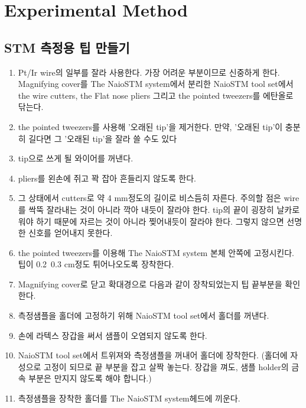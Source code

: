 \documentclass[a4paper, 10pt, nanum]{CSUniSchoolLabReport}
\begin{document}

\section{Experimental Method}

\subsection{STM 측정용 팁 만들기}
	\begin{enumerate}[label=\arabic*.]
		\item Pt/Ir wire의 일부를 잘라 사용한다. 가장 어려운 부분이므로 신중하게 한다.
		Magnifying cover를 The NaioSTM system에서 분리한 NaioSTM tool set에서 the wire cutters, the Flat nose pliers 그리고 the pointed tweezers를 에탄올로 닦는다.		
		\item the pointed tweezers를 사용해 '오래된 tip'을 제거한다. 만약, '오래된 tip'이 충분히 길다면 그 '오래된 tip'을 잘라 쓸 수도 있다
		\item tip으로 쓰게 될 와이어를 꺼낸다.
		\item pliers를 왼손에 쥐고 꽉 잡아 흔들리지 않도록 한다.
		\item 그 상태에서 cutters로 약 4 mm정도의 길이로 비스듬히 자른다. 주의할 점은 wire를 싹뚝 잘라내는 것이 아니라 깍아 내듯이 잘라야 한다. tip의 끝이 굉장히 날카로워야 하기 때문에 자르는 것이 아니라 찢어내듯이 잘라야 한다. 그렇지 않으면 선명한 신호를 얻어내지 못한다.
		\item the pointed tweezers를 이용해 The NaioSTM system 본체 안쪽에 고정시킨다. 팁이 0.2~0.3 cm정도 튀어나오도록 장착한다.
		\item Magnifying cover로 닫고 확대경으로 다음과 같이 장착되었는지 팁 끝부분을 확인한다.
		\item 측정샘플을 홀더에 고정하기 위해 NaioSTM tool set에서 홀더를 꺼낸다.
		\item 손에 라텍스 장갑을 써서 샘플이 오염되지 않도록 한다.
		\item NaioSTM tool set에서 트위져와 측정샘플을 꺼내어 홀더에 장착한다. (홀더에 자성으로 고정이 되므로 끝 부분을 잡고 살짝 놓는다.  장갑을 껴도, 샘플 holder의 금속 부분은 만지지 않도록 해야 합니다.)
		\item 측정샘플을 장착한 홀더를 The NaioSTM system헤드에 끼운다.
		\begin{figure}[htb!]

\end{figure}
\end{enumerate}
\end{document}
